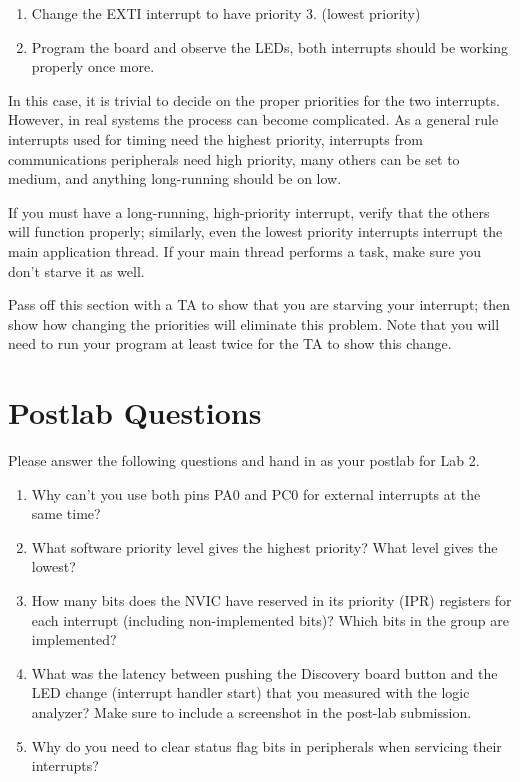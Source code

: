 \documentclass[openany,11pt,fleqn]{book} %
\begin{document}
\begin{exercise}
    \begin{enumerate}
        \item Change the EXTI interrupt to have priority 3. (lowest priority)
        \item Program the board and observe the LEDs, both interrupts should be working properly once more.
    \end{enumerate}
    
    In this case, it is trivial to decide on the proper priorities for the two interrupts. However, in real systems the process can become complicated. As a general rule interrupts used for timing need the highest priority, interrupts from communications peripherals need high priority, many others can be set to medium, and anything long-running should be on low. 
    
    If you must have a long-running, high-priority interrupt, verify that the others will function properly; similarly, even the lowest priority interrupts interrupt the main application thread. If your main thread performs a task, make sure you don't starve it as well.
    
\end{exercise}

\begin{assignment}
	Pass off this section with a TA to show that you are starving your interrupt; then show how changing the priorities will eliminate this problem. Note that you will need to run your program at least twice for the TA to show this change.
\end{assignment}

\section{\color{blue}Postlab Questions}
\begin{question}[Postlab 2]
	Please answer the following questions and hand in as your postlab for Lab 2.
	\begin{enumerate}
		\item Why can't you use both pins PA0 and PC0 for external interrupts at the same time?
		\item What software priority level gives the highest priority? What level gives the lowest?
		\item How many bits does the NVIC have reserved in its priority (IPR) registers for each interrupt (including non-implemented bits)?
		Which bits in the group are implemented?
		\item What was the latency between pushing the Discovery board button and the LED change (interrupt handler start) that you measured with the logic analyzer?
		Make sure to include a screenshot in the post-lab submission.
		\item Why do you need to clear status flag bits in peripherals when servicing their interrupts?
	\end{enumerate}
\end{question}
\end{document}

